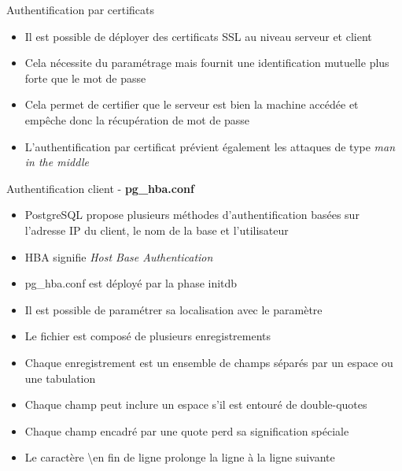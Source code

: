 \begin{frame}[fragile]{Authentification par certificats}

   \begin{itemize}
         \item Il est possible de déployer des certificats SSL au niveau serveur et client
         \item Cela nécessite du paramétrage mais fournit une identification mutuelle plus forte que le mot de passe
         \item Cela permet de certifier que le serveur est bien la machine accédée et empêche donc la récupération de mot de passe
         \item L'authentification par certificat prévient également les attaques de type \textit{man in the middle}
   \end{itemize}

\begin{toile}
\end{toile}

\end{frame}


\begin{frame}[fragile]{Authentification client - \textbf{pg\_hba.conf}}

   \begin{itemize}
      \item PostgreSQL propose plusieurs méthodes d'authentification basées sur l'adresse IP du client, le nom de la base et l'utilisateur
      \item HBA signifie \textit{Host Base Authentication}
      \item pg\_hba.conf est déployé par la phase initdb
      \item Il est possible de paramétrer sa localisation avec le paramètre 
      \item Le fichier est composé de plusieurs enregistrements
      \item Chaque enregistrement est un ensemble de champs séparés par un espace ou une tabulation
      \item Chaque champ peut inclure un espace s'il est entouré de double-quotes
      \item Chaque champ encadré par une quote perd sa signification spéciale
      \item Le caractère \textbackslash en fin de ligne prolonge la ligne à la ligne suivante
   \end{itemize}

\begin{toile}
\end{toile}

\end{frame}

